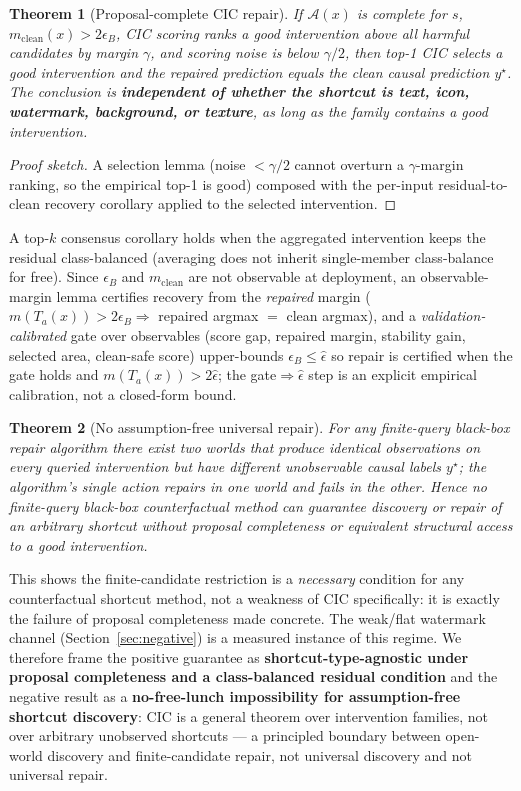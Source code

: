 \documentclass[11pt]{article}
\newtheorem{theorem}{Theorem}
\begin{document}
\begin{theorem}[Proposal-complete CIC repair]
If $\mathcal{A}(x)$ is complete for $s$, $m_{\mathrm{clean}}(x)>2\epsilon_B$, CIC
scoring ranks a good intervention above all harmful candidates by margin $\gamma$, and
scoring noise is below $\gamma/2$, then top-1 CIC selects a good intervention and the
repaired prediction equals the clean causal prediction $y^\star$. The conclusion is
\textbf{independent of whether the shortcut is text, icon, watermark, background, or
texture}, as long as the family contains a good intervention.
\end{theorem}
\begin{proof}[Proof sketch]
A selection lemma (noise $<\gamma/2$ cannot overturn a $\gamma$-margin ranking, so the
empirical top-1 is good) composed with the per-input residual-to-clean recovery
corollary applied to the selected intervention.
\end{proof}
A top-$k$ consensus corollary holds when the aggregated intervention keeps the residual
class-balanced (averaging does not inherit single-member class-balance for free). Since
$\epsilon_B$ and $m_{\mathrm{clean}}$ are not observable at deployment, an
observable-margin lemma certifies recovery from the \emph{repaired} margin
($m(T_a(x))>2\epsilon_B \Rightarrow$ repaired argmax $=$ clean argmax), and a
\emph{validation-calibrated} gate over observables (score gap, repaired margin,
stability gain, selected area, clean-safe score) upper-bounds $\epsilon_B\le\hat\epsilon$
so repair is certified when the gate holds and $m(T_a(x))>2\hat\epsilon$; the
gate$\Rightarrow\hat\epsilon$ step is an explicit empirical calibration, not a
closed-form bound.

\begin{theorem}[No assumption-free universal repair]
For any finite-query black-box repair algorithm there exist two worlds that produce
identical observations on every queried intervention but have different unobservable
causal labels $y^\star$; the algorithm's single action repairs in one world and fails in
the other. Hence no finite-query black-box counterfactual method can \emph{guarantee}
discovery or repair of an arbitrary shortcut without proposal completeness or equivalent
structural access to a good intervention.
\end{theorem}
This shows the finite-candidate restriction is a \emph{necessary} condition for any
counterfactual shortcut method, not a weakness of CIC specifically: it is exactly the
failure of proposal completeness made concrete. The weak/flat watermark channel
(Section~\ref{sec:negative}) is a measured instance of this regime. We therefore frame
the positive guarantee as \textbf{shortcut-type-agnostic under proposal completeness and
a class-balanced residual condition} and the negative result as a \textbf{no-free-lunch
impossibility for assumption-free shortcut discovery}: CIC is a general theorem over
intervention families, not over arbitrary unobserved shortcuts --- a principled boundary
between open-world discovery and finite-candidate repair, not universal discovery and not
universal repair.
\end{document}
